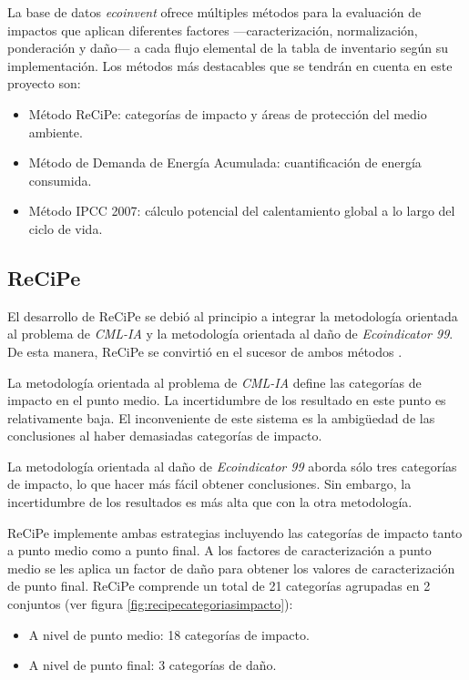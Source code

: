 La base de datos \textit{ecoinvent} ofrece múltiples métodos para la evaluación de impactos que aplican diferentes factores —caracterización, normalización, ponderación y daño— a cada flujo elemental de la tabla de inventario según su implementación. Los métodos más destacables que se tendrán en cuenta en este proyecto son:

\begin{itemize}
  \item Método ReCiPe: categorías de impacto y áreas de protección del medio ambiente.
  \item Método de Demanda de Energía Acumulada: cuantificación de energía consumida.
  \item Método IPCC 2007: cálculo potencial del calentamiento global a lo largo del ciclo de vida.
\end{itemize}

\subsection{ReCiPe}\label{sec:recipe}

El desarrollo de ReCiPe se debió al principio a integrar la metodología orientada al problema de \textit{CML-IA} y la metodología orientada al daño de \textit{Ecoindicator 99}. De esta manera, ReCiPe se convirtió en el sucesor de ambos métodos \cite{mgoedkoop3}.

La metodología orientada al problema de \textit{CML-IA} define las categorías de impacto en el punto medio. La incertidumbre de los resultado en este punto es relativamente baja. El inconveniente de este sistema es la ambigüedad de las conclusiones al haber demasiadas categorías de impacto.

La metodología orientada al daño de \textit{Ecoindicator 99} aborda sólo tres categorías de impacto, lo que hacer más fácil obtener conclusiones. Sin embargo, la incertidumbre de los resultados es más alta que con la otra metodología.

ReCiPe implemente ambas estrategias incluyendo las categorías de impacto tanto a punto medio como a punto final. A los factores de caracterización a punto medio se les aplica un factor de daño para obtener los valores de caracterización de punto final. ReCiPe comprende un total de 21 categorías agrupadas en 2 conjuntos (ver figura \ref{fig:recipecategoriasimpacto}):
\begin{itemize}
\item A nivel de punto medio: 18 categorías de impacto.
\item A nivel de punto final: 3 categorías de daño.
\end{itemize}


